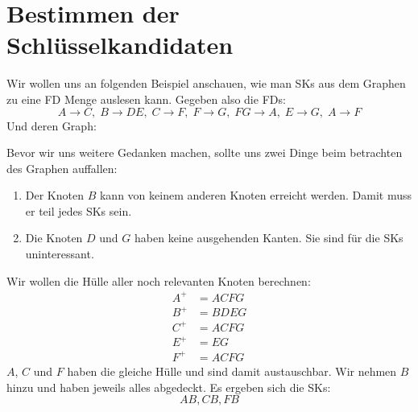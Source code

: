 \documentclass[a4paper, ngerman]{article}
\begin{document}
\section*{Bestimmen der Schlüsselkandidaten}
Wir wollen uns an folgenden Beispiel anschauen,
wie man SKs aus dem Graphen zu eine FD Menge auslesen kann.
Gegeben also die FDs:
$$
    A  \to C,\;
    B  \to DE,\;
    C  \to F,\;
    F  \to G,\;
    FG \to A,\;
    E  \to G,\;
    A  \to F
$$
Und deren Graph:
\begin{center}
\end{center}
Bevor wir uns weitere Gedanken machen,
sollte uns zwei Dinge beim betrachten des Graphen auffallen:
\begin{enumerate}
    \item Der Knoten $B$ kann von keinem anderen Knoten erreicht werden.
        Damit muss er teil jedes SKs sein.
    \item Die Knoten $D$ und $G$ haben keine ausgehenden Kanten.
        Sie sind für die SKs uninteressant.
\end{enumerate}
Wir wollen die Hülle aller noch relevanten Knoten berechnen:
\begin{align*}
    A^+ &= ACFG \\
    B^+ &= BDEG \\
    C^+ &= ACFG \\
    E^+ &= EG \\
    F^+ &= ACFG
\end{align*}
$A$, $C$ und $F$ haben die gleiche Hülle
und sind damit austauschbar.
Wir nehmen $B$ hinzu und haben
jeweils alles abgedeckt.
Es ergeben sich die SKs:
$$
    AB, CB, FB
$$
\end{document}
